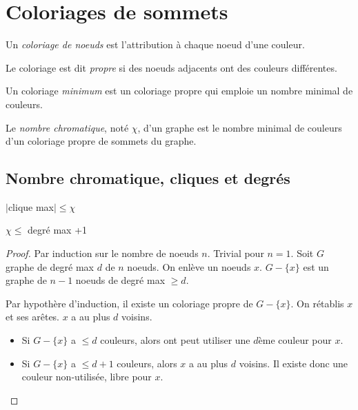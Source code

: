 \section{Coloriages de sommets}
Un \emph{coloriage de noeuds} est l’attribution à chaque noeud d’une couleur. 

Le coloriage est dit \emph{propre} si des noeuds adjacents ont des couleurs différentes.

Un coloriage \emph{minimum} est un coloriage propre qui emploie un nombre minimal de couleurs.

Le \emph{nombre chromatique}, noté $\chi$, d’un graphe est le nombre minimal de couleurs d’un coloriage propre de sommets du graphe.

\subsection{Nombre chromatique, cliques et degrés}
\begin{mytheo}
  $|$clique max$| \leq \chi$
\end{mytheo}

\begin{mytheo}
  $\chi \leq $ degré max +1
  \begin{proof}
    Par induction sur le nombre de noeuds $n$. 
    Trivial pour $n = 1$.
    Soit $G$ graphe de degré max $d$ de $n$ noeuds. On enlève un noeuds $x$. $G-\{x\}$ est un graphe de $n-1$ noeuds de degré max $\geq d$.
    
    Par hypothère d'induction, il existe un coloriage propre de $G-\{x\}$.
    On rétablis $x$ et ses arêtes. $x$ a au plus $d $ voisins.
    
    \begin{itemize}
    \item Si  $G-\{x\}$ a $\leq d$ couleurs, alors ont peut utiliser une $d$ème couleur pour $x$.
    \item  Si $G-\{x\}$ a $\leq d+1$ couleurs, alors $x$ a au plus $d$ voisins. Il existe donc une couleur non-utilisée, libre pour $x$.
    \end{itemize}
  \end{proof}
\end{mytheo}

